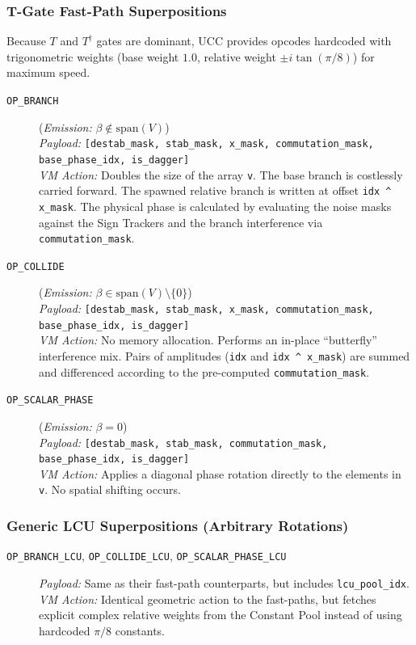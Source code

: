 \documentclass[11pt]{article}
\begin{document}
\subsubsection*{T-Gate Fast-Path Superpositions}
Because $T$ and $T^\dagger$ gates are dominant, UCC provides opcodes hardcoded with trigonometric weights (base weight $1.0$, relative weight $\pm i \tan(\pi/8)$) for maximum speed.
\begin{description}
    \item[\texttt{OP\_BRANCH}] (\textit{Emission:} $\beta \notin \text{span}(V)$) \\
    \textit{Payload:} \texttt{[destab\_mask, stab\_mask, x\_mask, commutation\_mask, base\_phase\_idx, is\_dagger]}\\
    \textit{VM Action:} Doubles the size of the array \texttt{v}. The base branch is costlessly carried forward. The spawned relative branch is written at offset \texttt{idx \textasciicircum{} x\_mask}. The physical phase is calculated by evaluating the noise masks against the Sign Trackers and the branch interference via \texttt{commutation\_mask}.

    \item[\texttt{OP\_COLLIDE}] (\textit{Emission:} $\beta \in \text{span}(V) \setminus \{0\}$) \\
    \textit{Payload:} \texttt{[destab\_mask, stab\_mask, x\_mask, commutation\_mask, base\_phase\_idx, is\_dagger]}\\
    \textit{VM Action:} No memory allocation. Performs an in-place ``butterfly'' interference mix. Pairs of amplitudes (\texttt{idx} and \texttt{idx \textasciicircum{} x\_mask}) are summed and differenced according to the pre-computed \texttt{commutation\_mask}.

    \item[\texttt{OP\_SCALAR\_PHASE}] (\textit{Emission:} $\beta = 0$) \\
    \textit{Payload:} \texttt{[destab\_mask, stab\_mask, commutation\_mask, base\_phase\_idx, is\_dagger]}\\
    \textit{VM Action:} Applies a diagonal phase rotation directly to the elements in \texttt{v}. No spatial shifting occurs.
\end{description}

\subsubsection*{Generic LCU Superpositions (Arbitrary Rotations)}
\begin{description}
    \item[\texttt{OP\_BRANCH\_LCU}, \texttt{OP\_COLLIDE\_LCU}, \texttt{OP\_SCALAR\_PHASE\_LCU}]
    \textit{Payload:} Same as their fast-path counterparts, but includes \texttt{lcu\_pool\_idx}.\\
    \textit{VM Action:} Identical geometric action to the fast-paths, but fetches explicit complex relative weights from the Constant Pool instead of using hardcoded $\pi/8$ constants.
\end{description}
\end{document}

